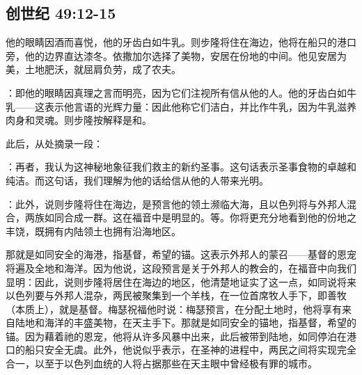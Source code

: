 
\subsection{创世纪 49:12-15}

他的眼睛因酒而喜悦，他的牙齿白如牛乳。则步隆将住在海边，他将在船只的港口旁，他的边界直达漆冬。依撒加尔选择了美物，安居在份地的中间。他见安居为美，土地肥沃，就屈肩负劳，成了农夫。\par

：即他的眼睛因真理之言而明亮，因为它们注视所有信从他的人。他的牙齿白如牛乳——这表示他言语的光辉力量：因此他称它们洁白，并比作牛乳，因为牛乳滋养肉身和灵魂。则步隆按解释是和。\par

此后，从处摘录一段：\par

：再者，我认为这神秘地象征我们救主的新约圣事。这句话表示圣事食物的卓越和纯洁。而这句话，我们理解为他的话给信从他的人带来光明。\par

：此外，说则步隆将住在海边，是预言他的领土濒临大海，且以色列将与外邦人混合，两族如同合成一群。这在福音中是明显的。等。你将更充分地看到他的份地之丰饶，既拥有内陆领土也拥有沿海地区。\par

那就是如同安全的海港，指基督，希望的锚。这表示外邦人的蒙召——基督的恩宠将遍及全地和海洋。因为他说，这段预言是关于外邦人的教会的，在福音中向我们显明：因此，说则步隆将居住在海边的地区，他清楚地证实了这一点，如同说将来以色列要与外邦人混杂，两民被聚集到一个羊栈，在一位首席牧人手下，即善牧（本质上），就是基督。梅瑟祝福他时说：梅瑟预言，在分配土地时，他将享有来自陆地和海洋的丰盛美物，在天主手下。那就是如同安全的锚地，指基督，希望的锚。因为藉着祂的恩宠，他将从许多风暴中出来，此后被带到陆地，如同停泊在港口的船只安全无虞。此外，他说似乎表示，在圣神的进程中，两民之间将实现完全合一，以至于以色列血统的人将占据那些在天主眼中曾经极有罪的城市。\par

